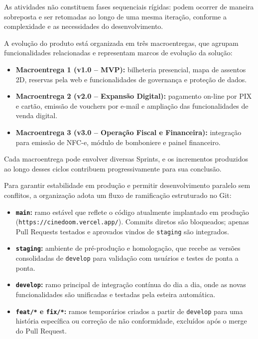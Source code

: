 As atividades não constituem fases sequenciais rígidas: podem ocorrer de maneira sobreposta e ser retomadas ao longo de uma mesma iteração, conforme a complexidade e as necessidades do desenvolvimento.

A evolução do produto está organizada em três macroentregas, que agrupam funcionalidades relacionadas e representam marcos de evolução da solução:

\begin{itemize}
\item \textbf{Macroentrega 1 (v1.0 – MVP):} bilheteria presencial, mapa de assentos 2D, reservas pela web e funcionalidades de governança e proteção de dados.
\item \textbf{Macroentrega 2 (v2.0 – Expansão Digital):} pagamento on-line por PIX e cartão, emissão de vouchers por e-mail e ampliação das funcionalidades de venda digital.
\item \textbf{Macroentrega 3 (v3.0 – Operação Fiscal e Financeira):} integração para emissão de NFC-e, módulo de bomboniere e painel financeiro.
\end{itemize}

Cada macroentrega pode envolver diversas Sprints, e os incrementos produzidos ao longo desses ciclos contribuem progressivamente para sua conclusão.


Para garantir estabilidade em produção e permitir desenvolvimento paralelo sem conflitos, a organização adota um fluxo de ramificação estruturado no Git:

\begin{itemize}
\item \textbf{\texttt{main}:} ramo estável que reflete o código atualmente implantado em produção (\texttt{https:/\allowbreak\hspace{0pt plus 1pt}/\allowbreak\hspace{0pt plus 1pt}cinedoom.\allowbreak\hspace{0pt plus 1pt}vercel.\allowbreak\hspace{0pt plus 1pt}app/}). Commits diretos são bloqueados; apenas Pull Requests testados e aprovados vindos de \texttt{staging} são integrados.
\item \textbf{\texttt{staging}:} ambiente de pré-produção e homologação, que recebe as versões consolidadas de \texttt{develop} para validação com usuários e testes de ponta a ponta.
\item \textbf{\texttt{develop}:} ramo principal de integração contínua do dia a dia, onde as novas funcionalidades são unificadas e testadas pela esteira automática.
\item \textbf{\texttt{feat/*} e \texttt{fix/*}:} ramos temporários criados a partir de \texttt{develop} para uma história específica ou correção de não conformidade, excluídos após o merge do Pull Request.
\end{itemize}

